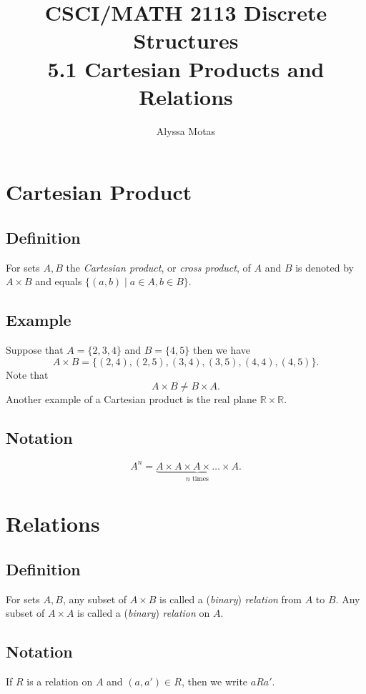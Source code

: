 \documentclass[11pt]{article}
\title{\textbf{CSCI/MATH 2113 Discrete Structures} \\ 5.1 Cartesian Products and Relations}
\author{Alyssa Motas}
\begin{document}
    \maketitle

    \pagebreak

    \tableofcontents

    \pagebreak

    \section{Cartesian Product}

    \subsection{Definition}
    For sets $A, B$ the \emph{Cartesian product}, or \emph{cross product}, of $A$ and $B$ is denoted by \(A \times B\) and equals \(\{(a,b) \mid a \in A, b \in B\}.\)

    \subsection{Example}
    Suppose that \(A = \{2,3,4\}\) and \(B = \{4,5\}\) then we have \[A \times B = \{(2,4),(2,5),(3,4),(3,5),(4,4),(4,5)\}.\] Note that \[A \times B \neq B \times A.\] Another example of a Cartesian product is the real plane \(\mathbb{R} \times \mathbb{R}\).

    \subsection{Notation}
    \[A^n = \underbrace{A \times A \times A \times \dots \times A}_\text{$n$ times}.\]

    \pagebreak

    \section{Relations}

    \subsection{Definition}
    For sets $A, B$, any subset of \(A \times B\) is called a (\emph{binary}) \emph{relation} from $A$ to $B$. Any subset of \(A \times A\) is called a (\emph{binary}) \emph{relation} on $A$.

    \subsection{Notation}
    If $R$ is a relation on $A$ and \((a,a') \in R\), then we write \(a R a'\). 
\end{document}

